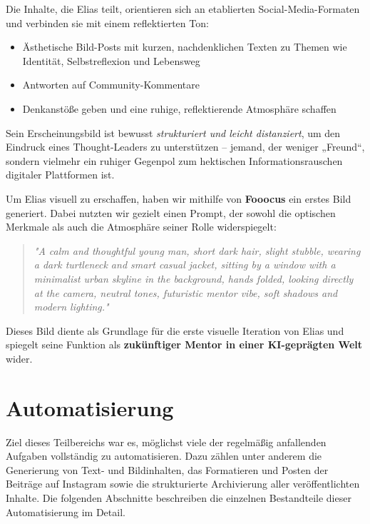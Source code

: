 \documentclass[a4paper,12pt]{article}
\begin{document}
Die Inhalte, die Elias teilt, orientieren sich an etablierten Social-Media-Formaten und verbinden sie mit einem reflektierten Ton:

\begin{itemize}
    \item Ästhetische Bild-Posts mit kurzen, nachdenklichen Texten zu Themen wie Identität, Selbstreflexion und Lebensweg
    \item Antworten auf Community-Kommentare
    \item Denkanstöße geben und eine ruhige, reflektierende Atmosphäre schaffen
\end{itemize}

Sein Erscheinungsbild ist bewusst \textit{strukturiert und leicht distanziert}, um den Eindruck eines Thought-Leaders zu unterstützen – jemand, der weniger „Freund“, sondern vielmehr ein ruhiger Gegenpol zum hektischen Informationsrauschen digitaler Plattformen ist.

Um Elias visuell zu erschaffen, haben wir mithilfe von \textbf{Fooocus} ein erstes Bild generiert. Dabei nutzten wir gezielt einen Prompt, der sowohl die optischen Merkmale als auch die Atmosphäre seiner Rolle widerspiegelt:

\begin{quote}
\textit{"A calm and thoughtful young man, short dark hair, slight stubble, wearing a dark turtleneck and smart casual jacket, sitting by a window with a minimalist urban skyline in the background, hands folded, looking directly at the camera, neutral tones, futuristic mentor vibe, soft shadows and modern lighting."}
\end{quote}

Dieses Bild diente als Grundlage für die erste visuelle Iteration von Elias und spiegelt seine Funktion als \textbf{zukünftiger Mentor in einer KI-geprägten Welt} wider.

\section{Automatisierung}

Ziel dieses Teilbereichs war es, möglichst viele der regelmäßig anfallenden Aufgaben vollständig zu automatisieren. Dazu zählen unter anderem die Generierung von Text- und Bildinhalten, das Formatieren und Posten der Beiträge auf Instagram sowie die strukturierte Archivierung aller veröffentlichten Inhalte. Die folgenden Abschnitte beschreiben die einzelnen Bestandteile dieser Automatisierung im Detail.
\end{document}
